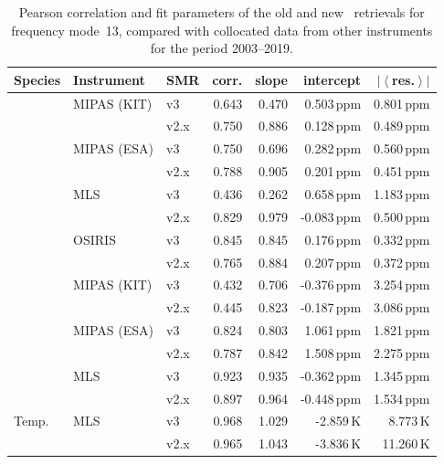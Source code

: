 \begin{table}[tbhp]
\centering
\caption{Pearson correlation and fit parameters of the old and new \smr\
retrievals for frequency mode~13, compared with collocated data from other
instruments for the period 2003--2019.
}
\label{tab:fm13:stats}
\begin{tabular}{lllrrrr}
    \toprule
    \textbf{Species} & \textbf{Instrument} & \textbf{SMR} & \textbf{corr.} & \textbf{slope} & \textbf{intercept} & \textbf{$\left|\left<\right.\right.$res.$\left.\left.\right>\right|$} \\
    \midrule
    \chem{O3}   & MIPAS (KIT)   & v3    & 0.643 & 0.470 & 0.503\,ppm    & 0.801\,ppm \\
                &               & v2.x  & 0.750 & 0.886 & 0.128\,ppm    & 0.489\,ppm \\
    \cline{2-7}
                & MIPAS (ESA)   & v3    & 0.750 & 0.696 & 0.282\,ppm    & 0.560\,ppm \\
                &               & v2.x  & 0.788 & 0.905 & 0.201\,ppm    & 0.451\,ppm \\
    \cline{2-7}
                & MLS           & v3    & 0.436 & 0.262 &  0.658\,ppm   & 1.183\,ppm \\
                &               & v2.x  & 0.829 & 0.979 & -0.083\,ppm   & 0.500\,ppm \\
    \cline{2-7}
                & OSIRIS        & v3    & 0.845 & 0.845 & 0.176\,ppm    & 0.332\,ppm \\
                &               & v2.x  & 0.765 & 0.884 & 0.207\,ppm    & 0.372\,ppm \\
    \midrule
    \chem{H_2O} & MIPAS (KIT)   & v3    & 0.432 & 0.706 & -0.376\,ppm   & 3.254\,ppm \\
                &               & v2.x  & 0.445 & 0.823 & -0.187\,ppm   & 3.086\,ppm \\
    \cline{2-7}
                & MIPAS (ESA)   & v3    & 0.824 & 0.803 &  1.061\,ppm   & 1.821\,ppm \\
                &               & v2.x  & 0.787 & 0.842 &  1.508\,ppm   & 2.275\,ppm \\
    \cline{2-7}
                & MLS           & v3    & 0.923 & 0.935 & -0.362\,ppm   & 1.345\,ppm \\
                &               & v2.x  & 0.897 & 0.964 & -0.448\,ppm   & 1.534\,ppm \\
    \midrule
    Temp.       & MLS           & v3    & 0.968 & 1.029 & -2.859\,K     &  8.773\,K \\
                &               & v2.x  & 0.965 & 1.043 & -3.836\,K     & 11.260\,K \\
    \bottomrule
\end{tabular}
\end{table}

